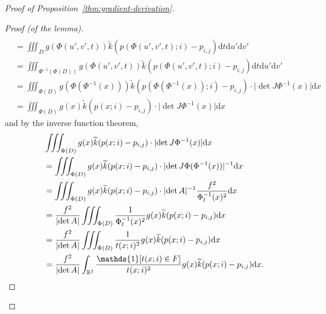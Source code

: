 \documentclass{article}
\newcommand{\R}{\mathbb{R}}
\newcommand{\ind}{\mathds{1}}
\newcommand{\dif}{\mathrm{d}}
\begin{document}
\begin{proof}[Proof of Proposition~\ref{thm:gradient-derivation}]
\begin{proof}[Proof (of the lemma)]
\begin{align*}
            \\ &= \iiint_D g(\Phi(u',v',t)) \widetilde{k}(p(\Phi(u',v',t); i)-p_{i,j}) \dif t \dif u' \dif v'
            \\ &= \iiint_{\Phi^{-1}(\Phi(D))} g(\Phi(u',v',t)) \widetilde{k}(p(\Phi(u',v',t); i)-p_{i,j}) \dif t \dif u' \dif v'
            \\ &= \iiint_{\Phi(D)} g(\Phi(\Phi^{-1}(x))) \widetilde{k}(p(\Phi(\Phi^{-1}(x)); i)-p_{i,j}) \cdot \lvert \det J\Phi^{-1}(x) \rvert \dif x
            \\ &= \iiint_{\Phi(D)} g(x) \widetilde{k}(p(x; i)-p_{i,j}) \cdot \lvert \det J\Phi^{-1}(x) \rvert \dif x
        \end{align*}
        and by the inverse function theorem,
        \begin{align*}
            & \iiint_{\Phi(D)} g(x) \widetilde{k}(p(x; i)-p_{i,j}) \cdot \lvert \det J\Phi^{-1}(x) \rvert \dif x
            \\ &= \iiint_{\Phi(D)} g(x) \widetilde{k}(p(x; i)-p_{i,j}) \cdot \lvert \det J\Phi(\Phi^{-1}(x)) \rvert^{-1} \dif x
            \\ &= \iiint_{\Phi(D)} g(x) \widetilde{k}(p(x; i)-p_{i,j}) \cdot \lvert \det A \rvert^{-1} \frac{f^2}{\Phi^{-1}_t(x)^2} \dif x
            \\ &= \frac{f^2}{\lvert \det A \rvert} \iiint_{\Phi(D)} \frac{1}{\Phi^{-1}_t(x)^2} g(x) \widetilde{k}(p(x; i)-p_{i,j}) \dif x
            \\ &= \frac{f^2}{\lvert \det A \rvert} \iiint_{\Phi(D)} \frac{1}{t(x; i)^2} g(x) \widetilde{k}(p(x; i)-p_{i,j}) \dif x
            \\ &= \frac{f^2}{\lvert \det A \rvert} \int_{\R^3} \frac{\ind[t(x; i) \in F]}{t(x; i)^2} g(x) \widetilde{k}(p(x; i)-p_{i,j}) \dif x.
            \qedhere
        \end{align*}
    \end{proof}


\end{proof}
\end{document}

